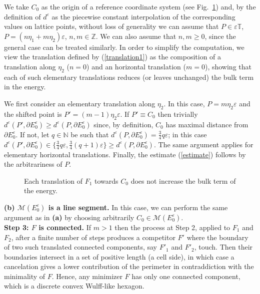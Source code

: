 \documentclass{interact}
\numberwithin{equation}{section}
\theoremstyle{definition}
\newcommand{\Z}{\mathbb{Z}}
\newcommand{\N}{\mathbb{N}}
\renewcommand{\epsilon}{\varepsilon}
\def\e{\epsilon}
\begin{document}
We take $C_0$ as the origin of a reference coordinate system (see Fig.~\ref{figsystem}) and, by the definition of $d^\epsilon$ as the piecewise constant interpolation of the corresponding values on lattice points, without loss of generality we can assume that $P\in\epsilon\mathbb{T}$, $P=(n\eta_1+m\eta_2)\epsilon$, $n,m\in\Z$. We can also assume that $n,m\geq0$, since the general case can be treated similarly. In order to simplify the computation, we view the translation defined by (\ref{translation1}) as the composition of a translation along $\eta_2$ ($n=0$) and an horizontal translation ($m=0$), showing that each of such elementary translations reduces (or leaves unchanged) the bulk term in the energy.

We first consider an elementary translation along $\eta_2$. In this case, $P=m\eta_2\epsilon$ and the shifted point is $P'=(m-1)\eta_2\epsilon$. If $P'\equiv C_0$ then trivially $d^\epsilon(P',\partial E_0^\e)\geq d^\epsilon(P,\partial E_0^\e)$ since, by definition, $C_0$ has maximal distance from $\partial E^\epsilon_0$. If not, let $q\in\N$ be such that $d^\epsilon(P,\partial E_0^\e)=\frac{3}{4}q\epsilon$; in this case $d^\epsilon(P',\partial E_0^\e)\in\{\frac{3}{4}q\epsilon,\frac{3}{4}(q+1)\epsilon\}\geq d^\epsilon(P,\partial E_0^\e)$. The same argument applies for elementary horizontal translations. Finally, the estimate (\ref{estimate}) follows by the arbitrariness of $P$.\\
\begin{figure}[htbp]
\centering
\def\svgwidth{200pt}

\caption{Each translation of $F_1$ towards $C_0$ does not increase the bulk term of the energy.}\label{figsystem}
\end{figure}
\noindent
{\bf (b) $\mathcal{M}(E^\epsilon_0)$ is a line segment.} In this case, we can perform the same argument as in {\bf (a)} by choosing arbitrarily $C_0\in\mathcal{M}(E^\epsilon_0)$. 
\\
\noindent
{\bf Step 3: $F$ is connected.} If $m>1$ then the process at Step 2, applied to $F_1$ and $F_2$, after a finite number of steps produces a competitor $F'$ where the boundary of two such translated connected components, say $F'_1$ and $F'_2$, touch. Then their boundaries intersect in a set of positive length (a cell side), in which case a cancelation gives a lower contribution of the perimeter in contraddiction with the minimality of $F$. Hence, any minimizer $F$ has only one connected component, which is a discrete convex Wulff-like hexagon.
\end{document}
